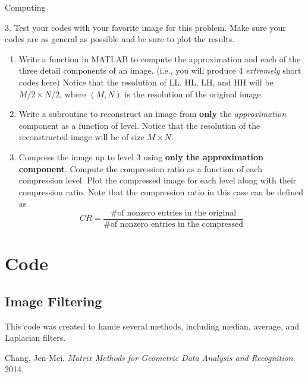 \begin{section}{Computing}
\begin{homeworkSection}{3. }
Test your codes with your favorite image for this problem. Make sure your codes are as general as possible and be sure to plot the results.
\renewcommand{\theenumi}{\alph{enumi}}
\begin{enumerate}
	\item Write a function in \textsc{MATLAB} to compute the approximation and each of the three detail components of an image. (i.e., you will produce 4 \textit{extremely} short codes here) Notice that the resolution of LL, HL, LH, and HH will be $M/2 \times N/2$, where $(M,N)$ is the resolution of the original image.
	\item Write a subroutine to reconstruct an image from \textbf{only} the \textit{approximation} component as a function of level. Notice that the resolution of the reconstructed image will be of size $M\times N$.
	\item Compress the image up to level 3 using \textbf{only the approximation component}. Compute the compression ratio as a function of each compression level. Plot the compressed image for each level along with their compression ratio. Note that the compression ratio in this case can be defined as
	$$
		CR = \frac{ \text{\# of nonzero entries in the original} }{ \text{\# of nonzero entries in the compressed} }
	$$
\end{enumerate}
\end{homeworkSection}

\end{section}

\newpage

\appendix

\section{Code}\label{code}

\subsection{Image Filtering}
This code was created to hande several methods, including median, average, and Laplacian filters.



\begin{thebibliography}{10}
    Chang, Jen-Mei. \textit{Matrix Methods for Geometric Data Analysis and Recognition}. 2014.

\end{thebibliography}


